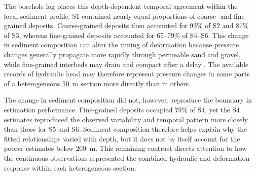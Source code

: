 The borehole log places this depth-dependent temporal agreement within the local sediment profile. S1 contained nearly equal proportions of coarse- and fine-grained deposits. Coarse-grained deposits then accounted for 93\% of S2 and 87\% of S3, whereas fine-grained deposits accounted for 65--79\% of S4--S6. This change in sediment composition can alter the timing of deformation because pressure changes generally propagate more rapidly through permeable sand and gravel, while fine-grained interbeds may drain and compact after a delay \citep{galloway_land_1999,gambolati_2015,hung_measuring_2021}. The available records of hydraulic head may therefore represent pressure changes in some parts of a heterogeneous 50~m section more directly than in others.

The change in sediment composition did not, however, reproduce the boundary in estimation performance. Fine-grained deposits occupied 79\% of S4, yet the S4 estimates reproduced the observed variability and temporal pattern more closely than those for S5 and S6. Sediment composition therefore helps explain why the fitted relationships varied with depth, but it does not by itself account for the poorer estimates below 200~m. This remaining contrast directs attention to how the continuous observations represented the combined hydraulic and deformation response within each heterogeneous section.

